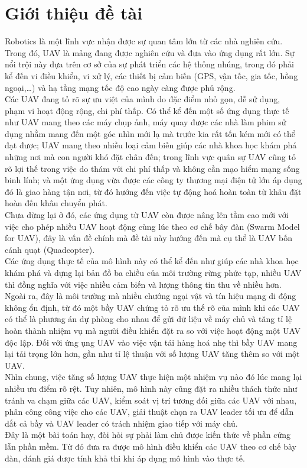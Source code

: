 \chapter{Giới thiệu đề tài}
\pagestyle{fancy}
Robotics là một lĩnh vực nhận được sự quan tâm lớn từ các nhà nghiên cứu. Trong đó, UAV là mảng đang được nghiên cứu và đưa vào ứng dụng rất lớn. Sự nổi trội này dựa trên cơ sở của sự phát triển các hệ thống nhúng, trong đó phải kể đến vi điều khiển, vi xử lý, các thiết bị cảm biến (GPS, vận tốc, gia tốc, hồng ngoại,…) và hạ tầng mạng tốc độ cao ngày càng được phủ rộng.\\
Các UAV đang tỏ rõ sự ưu việt của mình do đặc điểm nhỏ gọn, dễ sử dụng, phạm vi hoạt động rộng, chi phí thấp. Có thể kể đến một số ứng dụng thực tế như UAV mang theo các máy chụp ảnh, máy quay được các nhà làm phim sử dụng nhằm mang đến một góc nhìn mới lạ mà trước kia rất tốn kém mới có thể đạt được; UAV mang theo nhiều loại cảm biến giúp các nhà khoa học khám phá những nơi mà con người khó đặt chân đến; trong lĩnh vực quân sự UAV cũng tỏ rõ lợi thế trong việc do thám với chi phí thấp và không cần mạo hiểm mạng sống binh lính; và một ứng dụng vừa được các công ty thương mại điện tử lớn áp dụng đó là giao hàng tận nơi, từ đó hướng đến việc tự động hoá hoàn toàn từ khâu đặt hoàn đến khâu chuyển phát.\\
Chưa dừng lại ở đó, các ứng dụng từ UAV còn được nâng lên tầm cao mới với việc cho phép nhiều UAV hoạt động cùng lúc theo cơ chế bây đàn (Swarm Model for UAV), đây là vấn đề chính mà đề tài này hướng đến mà cụ thể là UAV bốn cánh quạt (Quadcopter).\\
Các ứng dụng thực tế của mô hình này có thể kể đến như giúp các nhà khoa học khám phá và dựng lại bản đồ ba chiều của môi trường rừng phức tạp, nhiều UAV thì đồng nghĩa với việc nhiều cảm biến và lượng thông tin thu về nhiều hơn. Ngoài ra, đây là môi trường mà nhiều chướng ngại vật và tín hiệu mạng di động không ổn định, từ đó một bầy UAV chứng tỏ rõ ưu thế rõ của mình khi các UAV có thể là phương án dự phòng cho nhau để gửi dữ liệu về máy chủ và tăng tỉ lệ hoàn thành nhiệm vụ mà người điều khiển đặt ra so với việc hoạt động một UAV độc lập. Đối với ứng ụng UAV vào việc vận tải hàng hoá nhẹ thì bầy UAV mang lại tải trọng lớn hơn, gần như tỉ lệ thuận với số lượng UAV tăng thêm so với một UAV.\\
Nhìn chung, việc tăng số lượng UAV thực hiện một nhiệm vụ nào đó lúc mang lại nhiều ưu điểm rõ rệt. Tuy nhiên, mô hình này cũng đặt ra nhiều thách thức như tránh va chạm giữa các UAV, kiểm soát vị trí tương đối giữa các UAV với nhau, phân công công việc cho các UAV, giải thuật chọn ra UAV leader tối ưu để dẫn dắt cả bầy và UAV leader có trách nhiệm giao tiếp với máy chủ.\\
Đây là một bài toán hay, đòi hỏi sự phải làm chủ được kiến thức về phần cứng lẫn phần mềm. Từ đó đưa ra được mô hình điều khiển các UAV theo cơ chế bày đàn, đánh giá được tính khả thi khi áp dụng mô hình vào thực tế.


